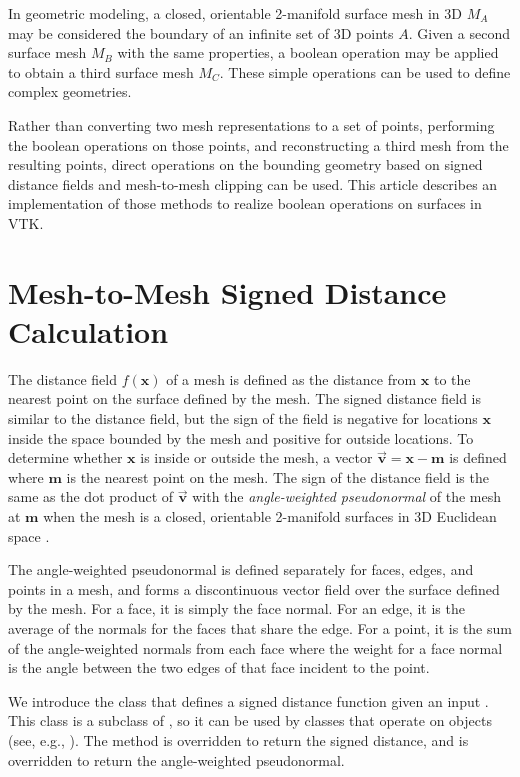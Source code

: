 \documentclass{InsightArticle}
\def\x{{\mathbf x}}
\def\m{{\mathbf m}}
\def\v{{\overrightarrow{\mathbf v}}}
\begin{document}
In geometric modeling, a closed, orientable 2-manifold surface mesh in 3D $M_A$ may be considered the boundary of an infinite set of 3D points $A$. Given a second surface mesh $M_B$ with the same properties, a boolean operation may be applied to obtain a third surface mesh $M_C$. These simple operations can be used to define complex geometries.

Rather than converting two mesh representations to a set of points, performing the boolean operations on those points, and reconstructing a third mesh from the resulting points, direct operations on the bounding geometry based on signed distance fields and mesh-to-mesh clipping can be used. This article describes an implementation of those methods to realize boolean operations on surfaces in VTK.

\section{Mesh-to-Mesh Signed Distance Calculation}

The distance field $f(\x)$ of a mesh is defined as the distance from $\x$ to the nearest point on the surface defined by the mesh. The signed distance field is similar to the distance field, but the sign of the field is negative for locations $\x$ inside the space bounded by the mesh and positive for outside locations. To determine whether $\x$ is inside or outside the mesh, a vector $\v = \x - \m$ is defined where $\m$ is the nearest point on the mesh. The sign of the distance field is the same as the dot product of $\v$ with the \emph{angle-weighted pseudonormal} of the mesh at $\m$ when the mesh is a closed, orientable 2-manifold surfaces in 3D Euclidean space \cite{Baerentzen2005}.  

The angle-weighted pseudonormal is defined separately for faces, edges, and points in a mesh, and forms a discontinuous vector field over the surface defined by the mesh. For a face, it is simply the face normal. For an edge, it is the average of the normals for the faces that share the edge. For a point, it is the sum of the angle-weighted normals from each face where the weight for a face normal is the angle between the two edges of that face incident to the point.

We introduce the  class that defines a signed distance function given an input . This class is a subclass of , so it can be used by classes that operate on  objects (see, e.g., ). The method  is overridden to return the signed distance, and  is overridden to return the angle-weighted pseudonormal.
\end{document}
